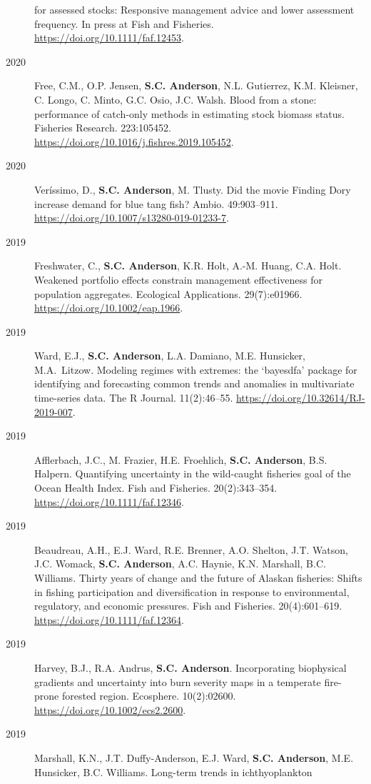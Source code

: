 \begin{description}
for assessed stocks: Responsive management advice and lower assessment
frequency. In press at Fish and Fisheries.
\url{https://doi.org/10.1111/faf.12453}.
\item[2020]
Free, C.M., O.P. Jensen, \textbf{S.C. Anderson}, N.L. Gutierrez, K.M.
Kleisner, C. Longo, C. Minto, G.C. Osio, J.C. Walsh. Blood from a stone:
performance of catch-only methods in estimating stock biomass status.
Fisheries Research. 223:105452.
\url{https://doi.org/10.1016/j.fishres.2019.105452}.
\item[2020]
Veríssimo, D., \textbf{S.C. Anderson}, M. Tlusty. Did the movie Finding
Dory increase demand for blue tang fish? Ambio. 49:903--911.
\url{https://doi.org/10.1007/s13280-019-01233-7}.
\item[2019]
Freshwater, C., \textbf{S.C. Anderson}, K.R. Holt, A.-M. Huang, C.A.
Holt. Weakened portfolio effects constrain management effectiveness for
population aggregates. Ecological Applications. 29(7):e01966.
\url{https://doi.org/10.1002/eap.1966}.
\item[2019]
Ward, E.J., \textbf{S.C. Anderson}, L.A. Damiano, M.E. Hunsicker,
M.A.\ Litzow. Modeling regimes with extremes: the `bayesdfa' package for
identifying and forecasting common trends and anomalies in multivariate
time-series data. The R Journal. 11(2):46--55.
\url{https://doi.org/10.32614/RJ-2019-007}.
\item[2019]
Afflerbach, J.C., M. Frazier, H.E. Froehlich, \textbf{S.C. Anderson},
B.S. Halpern. Quantifying uncertainty in the wild-caught fisheries goal
of the Ocean Health Index. Fish and Fisheries. 20(2):343--354.
\url{https://doi.org/10.1111/faf.12346}.
\item[2019]
Beaudreau, A.H., E.J. Ward, R.E. Brenner, A.O. Shelton, J.T. Watson,
J.C. Womack, \textbf{S.C. Anderson}, A.C. Haynie, K.N. Marshall, B.C.
Williams. Thirty years of change and the future of Alaskan fisheries:
Shifts in fishing participation and diversification in response to
environmental, regulatory, and economic pressures. Fish and Fisheries.
20(4):601--619. \url{https://doi.org/10.1111/faf.12364}.
\item[2019]
Harvey, B.J., R.A. Andrus, \textbf{S.C. Anderson}. Incorporating
biophysical gradients and uncertainty into burn severity maps in a
temperate fire-prone forested region. Ecosphere. 10(2):02600.
\url{https://doi.org/10.1002/ecs2.2600}.
\item[2019]
Marshall, K.N., J.T. Duffy-Anderson, E.J. Ward, \textbf{S.C. Anderson},
M.E. Hunsicker, B.C. Williams. Long-term trends in ichthyoplankton

\end{description}

